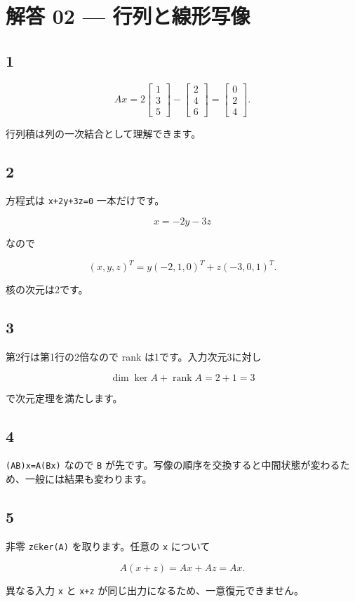 \documentclass[
  11pt,
  a4paper,
]{ltjsarticle}
\author{}
\date{}
\begin{document}
\hypertarget{ux89e3ux7b54-02-ux884cux5217ux3068ux7ddaux5f62ux5199ux50cf}{%
\section{解答 02 ---
行列と線形写像}\label{ux89e3ux7b54-02-ux884cux5217ux3068ux7ddaux5f62ux5199ux50cf}}

\hypertarget{section}{%
\subsection{1}\label{section}}

\[
Ax=2\begin{bmatrix}1\\3\\5\end{bmatrix}-\begin{bmatrix}2\\4\\6\end{bmatrix}
=\begin{bmatrix}0\\2\\4\end{bmatrix}.
\]

行列積は列の一次結合として理解できます。

\hypertarget{section-1}{%
\subsection{2}\label{section-1}}

方程式は \texttt{x+2y+3z=0} 一本だけです。

\[
x=-2y-3z
\]

なので

\[
(x,y,z)^T=y(-2,1,0)^T+z(-3,0,1)^T.
\]

核の次元は2です。

\hypertarget{section-2}{%
\subsection{3}\label{section-2}}

第2行は第1行の2倍なので rank は1です。入力次元3に対し

\[
\dim\ker A+\operatorname{rank}A=2+1=3
\]

で次元定理を満たします。

\hypertarget{section-3}{%
\subsection{4}\label{section-3}}

\texttt{(AB)x=A(Bx)} なので \texttt{B}
が先です。写像の順序を交換すると中間状態が変わるため、一般には結果も変わります。

\hypertarget{section-4}{%
\subsection{5}\label{section-4}}

非零 \texttt{z∈ker(A)} を取ります。任意の \texttt{x} について

\[
A(x+z)=Ax+Az=Ax.
\]

異なる入力 \texttt{x} と \texttt{x+z}
が同じ出力になるため、一意復元できません。
\end{document}
